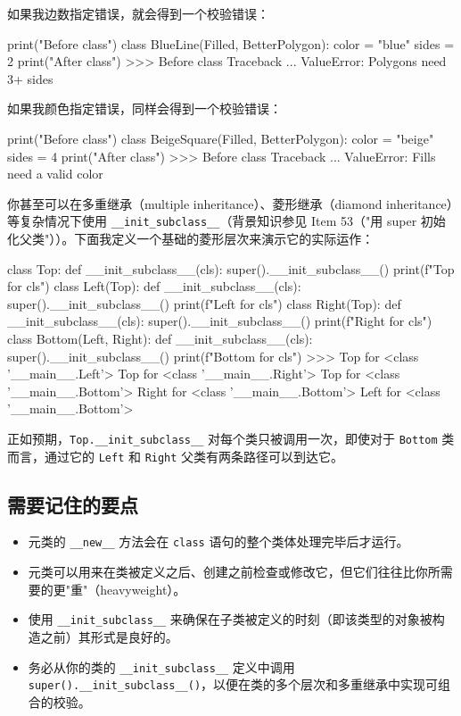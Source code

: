 如果我边数指定错误，就会得到一个校验错误：

\begin{codebox}[python]
print("Before class")
class BlueLine(Filled, BetterPolygon):
    color = "blue"
    sides = 2
print("After class")
>>>
Before class
Traceback ...
ValueError: Polygons need 3+ sides
\end{codebox}

如果我颜色指定错误，同样会得到一个校验错误：

\begin{codebox}[python]
print("Before class")
class BeigeSquare(Filled, BetterPolygon):
    color = "beige"
    sides = 4
print("After class")
>>>
Before class
Traceback ...
ValueError: Fills need a valid color
\end{codebox}

你甚至可以在多重继承（multiple inheritance）、菱形继承（diamond inheritance）等复杂情况下使用 \texttt{\_\_init\_subclass\_\_}（背景知识参见 Item 53（"用 super 初始化父类"））。下面我定义一个基础的菱形层次来演示它的实际运作：

\begin{codebox}[python]
class Top:
    def __init_subclass__(cls):
        super().__init_subclass__()
        print(f"Top for {cls}")
class Left(Top):
    def __init_subclass__(cls):
        super().__init_subclass__()
        print(f"Left for {cls}")
class Right(Top):
    def __init_subclass__(cls):
        super().__init_subclass__()
        print(f"Right for {cls}")
class Bottom(Left, Right):
    def __init_subclass__(cls):
        super().__init_subclass__()
        print(f"Bottom for {cls}")
>>>
Top for <class '__main__.Left'>
Top for <class '__main__.Right'>
Top for <class '__main__.Bottom'>
Right for <class '__main__.Bottom'>
Left for <class '__main__.Bottom'>
\end{codebox}

正如预期，\texttt{Top.\_\_init\_subclass\_\_} 对每个类只被调用一次，即使对于 \texttt{Bottom} 类而言，通过它的 \texttt{Left} 和 \texttt{Right} 父类有两条路径可以到达它。

\subsection{需要记住的要点}

\begin{itemize}
\item 元类的 \texttt{\_\_new\_\_} 方法会在 \texttt{class} 语句的整个类体处理完毕后才运行。
\item 元类可以用来在类被定义之后、创建之前检查或修改它，但它们往往比你所需要的更"重"（heavyweight）。
\item 使用 \texttt{\_\_init\_subclass\_\_} 来确保在子类被定义的时刻（即该类型的对象被构造之前）其形式是良好的。
\item 务必从你的类的 \texttt{\_\_init\_subclass\_\_} 定义中调用 \texttt{super().\_\_init\_subclass\_\_()}，以便在类的多个层次和多重继承中实现可组合的校验。
\end{itemize}

